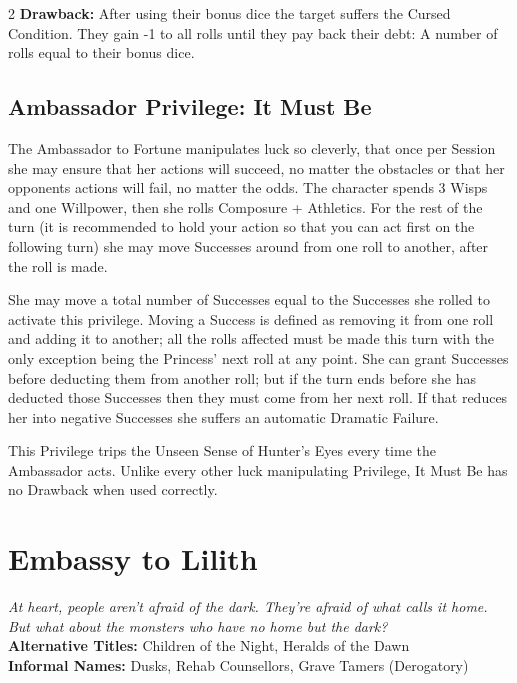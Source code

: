 \begin{multicols}{2}
\textbf{Drawback:} After using their bonus dice the target suffers the Cursed Condition. They gain -1 to all rolls until they pay back their debt: A number of rolls equal to their bonus dice.

\subsection*{Ambassador Privilege: It Must Be}

The Ambassador to Fortune manipulates luck so cleverly, that once per Session she may ensure that her actions will succeed, no matter the obstacles or that her opponents actions will fail, no matter the odds. The character spends 3 Wisps and one Willpower, then she rolls Composure + Athletics. For the rest of the turn (it is recommended to hold your action so that you can act first on the following turn) she may move Successes around from one roll to another, after the roll is made. 

She may move a total number of Successes equal to the Successes she rolled to activate this privilege. Moving a Success is defined as removing it from one roll and adding it to another; all the rolls affected must be made this turn with the only exception being the Princess' next roll at any point. She can grant Successes before deducting them from another roll; but if the turn ends before she has deducted those Successes then they must come from her next roll. If that reduces her into negative Successes she suffers an automatic Dramatic Failure. 

This Privilege trips the Unseen Sense of Hunter's Eyes every time the Ambassador acts. Unlike every other luck manipulating Privilege, It Must Be has no Drawback when used correctly. 


\section*{Embassy to Lilith}
\label{sec:EmbassyLilith}

\textit{At heart, people aren’t afraid of the dark. They’re afraid of what calls it home. But what about the monsters who have no home but the dark?}\\


\noindent \textbf{Alternative Titles:} Children of the Night, Heralds of the Dawn
\\

\noindent \textbf{Informal Names:} Dusks, Rehab Counsellors, Grave Tamers (Derogatory)



\end{multicols}
